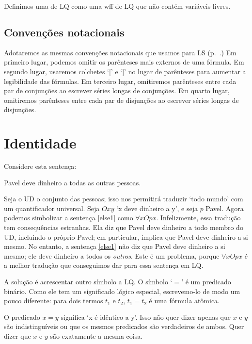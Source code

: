 Definimos uma  de LQ como uma wff de LQ que não contém variáveis livres.



\subsection{Convenções notacionais}

Adotaremos as mesmas convenções notacionais que usamos para LS (p.~\pageref{LSconventions}.) Em primeiro lugar, podemos omitir os parênteses mais externos de uma fórmula. Em segundo lugar, usaremos colchetes `[' e `]' no lugar de parênteses para aumentar a legibilidade das fórmulas. Em terceiro lugar, omitiremos parênteses entre cada par de conjunções ao escrever séries longas de conjunções. Em quarto lugar, omitiremos parênteses entre cada par de disjunções ao escrever séries longas de disjunções.

\section{Identidade}
\label{sec.identity}

Considere esta sentença:
\begin{earg}
\item[\ex{else1}] Pavel deve dinheiro a todas as outras pessoas.
\end{earg}
Seja o UD o conjunto das pessoas; isso nos permitirá traduzir `todo mundo' com um quantificador universal. Seja $Oxy$ `x deve dinheiro a y', e seja $p$ Pavel. Agora podemos simbolizar a sentença \ref{else1} como $\forall x Opx$. Infelizmente, essa tradução tem consequências estranhas. Ela diz que Pavel deve dinheiro a todo membro do UD, incluindo o próprio Pavel; em particular, implica que Pavel deve dinheiro a si mesmo. No entanto, a sentença \ref{else1} não diz que Pavel deve dinheiro a si mesmo; ele deve dinheiro a todos os \emph{outros}. Este é um problema, porque $\forall x Opx$ é a melhor tradução que conseguimos dar para essa sentença em LQ.

A solução é acrescentar outro símbolo a LQ. O símbolo `$=$' é um predicado binário. Como ele tem um significado lógico especial, escrevemo-lo de modo um pouco diferente: para dois termos $t_1$ e $t_2$, $t_1=t_2$ é uma fórmula atômica.

O predicado $x=y$ significa `x é idêntico a y'. Isso não quer dizer apenas que $x$ e $y$ são indistinguíveis ou que os mesmos predicados são verdadeiros de ambos. Quer dizer que $x$ e $y$ são exatamente a mesma coisa.

